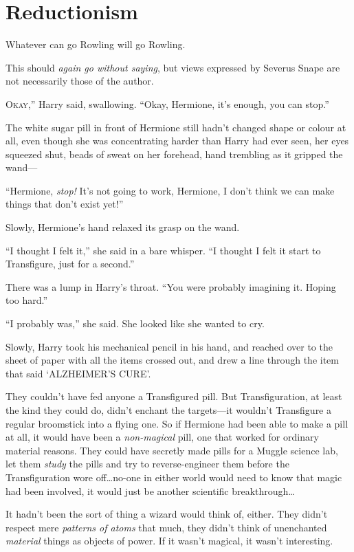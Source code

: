 \chapter{Reductionism}

\begin{chapterOpeningAuthorNote}
Whatever can go Rowling will go Rowling.

This should \emph{again go without saying}, but views expressed by Severus Snape are not necessarily those of the author.
\end{chapterOpeningAuthorNote}

\lettrine[ante=“]{O}{kay},” Harry said, swallowing. “Okay, Hermione, it’s enough, you can stop.”

The white sugar pill in front of Hermione still hadn’t changed shape or colour at all, even though she was concentrating harder than Harry had ever seen, her eyes squeezed shut, beads of sweat on her forehead, hand trembling as it gripped the wand—

“Hermione, \emph{stop!} It’s not going to work, Hermione, I don’t think we can make things that don’t exist yet!”

Slowly, Hermione’s hand relaxed its grasp on the wand.

“I thought I felt it,” she said in a bare whisper. “I thought I felt it start to Transfigure, just for a second.”

There was a lump in Harry’s throat. “You were probably imagining it. Hoping too hard.”

“I probably was,” she said. She looked like she wanted to cry.

Slowly, Harry took his mechanical pencil in his hand, and reached over to the sheet of paper with all the items crossed out, and drew a line through the item that said ‘ALZHEIMER’S CURE’.

They couldn’t have fed anyone a Transfigured pill. But Transfiguration, at least the kind they could do, didn’t enchant the targets—it wouldn’t Transfigure a regular broomstick into a flying one. So if Hermione had been able to make a pill at all, it would have been a \emph{non-magical} pill, one that worked for ordinary material reasons. They could have secretly made pills for a Muggle science lab, let them \emph{study} the pills and try to reverse-engineer them before the Transfiguration wore off…no-one in either world would need to know that magic had been involved, it would just be another scientific breakthrough…

It hadn’t been the sort of thing a wizard would think of, either. They didn’t respect mere \emph{patterns of atoms} that much, they didn’t think of unenchanted \emph{material} things as objects of power. If it wasn’t magical, it wasn’t interesting.


